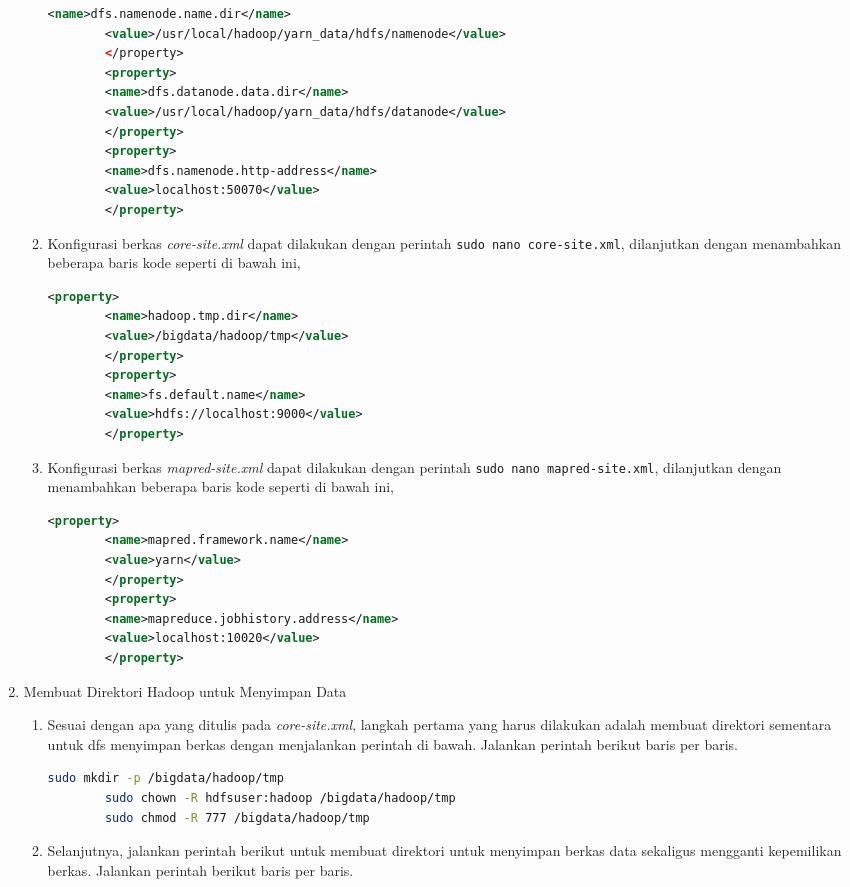 \begin{enumerate}
\begin{enumerate}
\begin{lstlisting}[language=XML]
		<name>dfs.namenode.name.dir</name>
		<value>/usr/local/hadoop/yarn_data/hdfs/namenode</value>
		</property>
		<property>
		<name>dfs.datanode.data.dir</name>
		<value>/usr/local/hadoop/yarn_data/hdfs/datanode</value>
		</property>
		<property>
		<name>dfs.namenode.http-address</name>
		<value>localhost:50070</value>
		</property>
      \end{lstlisting}
    \item Konfigurasi berkas \textit{core-site.xml} dapat dilakukan dengan perintah \verb|sudo nano core-site.xml|, dilanjutkan dengan menambahkan beberapa baris kode seperti di bawah ini,
       \begin{lstlisting}[language=XML]
		<property>
		<name>hadoop.tmp.dir</name>
		<value>/bigdata/hadoop/tmp</value>
		</property>
		<property>
		<name>fs.default.name</name>
		<value>hdfs://localhost:9000</value>
		</property>
      \end{lstlisting}
    \item Konfigurasi berkas \textit{mapred-site.xml} dapat dilakukan dengan perintah \verb|sudo nano mapred-site.xml|, dilanjutkan dengan menambahkan beberapa baris kode seperti di bawah ini,
       \begin{lstlisting}[language=XML]
		<property>
		<name>mapred.framework.name</name>
		<value>yarn</value>
		</property>
		<property>
		<name>mapreduce.jobhistory.address</name>
		<value>localhost:10020</value>
		</property>
      \end{lstlisting}
  \end{enumerate}
  \item Membuat Direktori Hadoop untuk Menyimpan Data
  \begin{enumerate}
    \item Sesuai dengan apa yang ditulis pada \textit{core-site.xml}, langkah pertama yang harus dilakukan adalah membuat direktori sementara untuk dfs menyimpan berkas dengan menjalankan perintah di bawah. Jalankan perintah berikut baris per baris.
       \begin{lstlisting}[language=bash]
		sudo mkdir -p /bigdata/hadoop/tmp
		sudo chown -R hdfsuser:hadoop /bigdata/hadoop/tmp
		sudo chmod -R 777 /bigdata/hadoop/tmp
      \end{lstlisting}
    \item Selanjutnya, jalankan perintah berikut untuk membuat direktori untuk menyimpan berkas data sekaligus mengganti kepemilikan berkas. Jalankan perintah berikut baris per baris.
       \begin{lstlisting}[language=bash]

\end{lstlisting}
\end{enumerate}
\end{enumerate}
